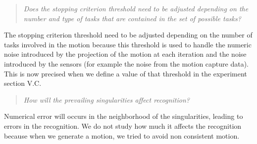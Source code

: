 \documentclass[11pt]{article}
\begin{document}
\begin{quote}
\textit{
Does the stopping criterion threshold need to be adjusted depending on the number and type of tasks that are contained in the set of possible tasks?
}
\end{quote}
The stopping criterion threshold need to be adjusted depending on the number of tasks involved in
the motion because this threshold is used to handle the numeric noise introduced by the
projection of the motion at each iteration and the noise introduced by the sensors (for example 
the noise from the motion capture data).\\
This is now precised when we define a value of that threshold in the experiment section V.C.

\begin{quote}
\textit{
  How will the prevailing singularities affect recognition?
}
\end{quote}
Numerical error will occurs in the neighborhood of the singularities,
leading to errors in the recognition. We do not study how much it affects
the recognition because when we generate a motion, we tried to avoid
non consistent motion.



\end{document}
